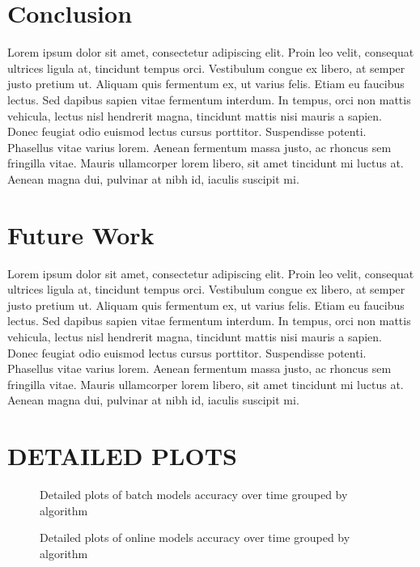 \documentclass{sig-alternate-br}
\begin{document}
\section{Conclusion}

Lorem ipsum dolor sit amet, consectetur adipiscing elit. Proin leo velit, consequat ultrices ligula at, tincidunt tempus orci. Vestibulum congue ex libero, at semper justo pretium ut. Aliquam quis fermentum ex, ut varius felis. Etiam eu faucibus lectus. Sed dapibus sapien vitae fermentum interdum. In tempus, orci non mattis vehicula, lectus nisl hendrerit magna, tincidunt mattis nisi mauris a sapien. Donec feugiat odio euismod lectus cursus porttitor. Suspendisse potenti. Phasellus vitae varius lorem. Aenean fermentum massa justo, ac rhoncus sem fringilla vitae. Mauris ullamcorper lorem libero, sit amet tincidunt mi luctus at. Aenean magna dui, pulvinar at nibh id, iaculis suscipit mi.

\section{Future Work}

Lorem ipsum dolor sit amet, consectetur adipiscing elit. Proin leo velit, consequat ultrices ligula at, tincidunt tempus orci. Vestibulum congue ex libero, at semper justo pretium ut. Aliquam quis fermentum ex, ut varius felis. Etiam eu faucibus lectus. Sed dapibus sapien vitae fermentum interdum. In tempus, orci non mattis vehicula, lectus nisl hendrerit magna, tincidunt mattis nisi mauris a sapien. Donec feugiat odio euismod lectus cursus porttitor. Suspendisse potenti. Phasellus vitae varius lorem. Aenean fermentum massa justo, ac rhoncus sem fringilla vitae. Mauris ullamcorper lorem libero, sit amet tincidunt mi luctus at. Aenean magna dui, pulvinar at nibh id, iaculis suscipit mi.


  
%

\newpage

\appendix
\section{DETAILED PLOTS}
\label{appendix:a}

\begin{figure}[h]
\centering 
{}
\caption{Detailed plots of batch models accuracy over time grouped by algorithm}
\label{fig:batchall}
\end{figure}

\begin{figure}[h]
\centering 
{}
\caption{Detailed plots of online models accuracy over time grouped by algorithm}
\label{fig:online_all}
\end{figure}
\end{document}

